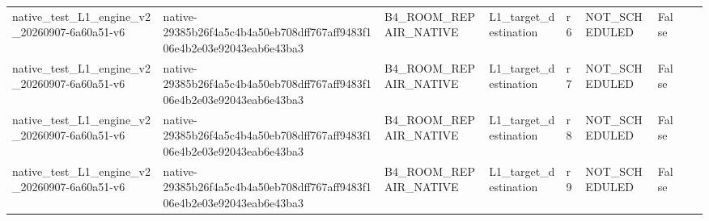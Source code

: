 \begin{tabular}{lllllllll}
native\_test\_L1\_engine\_v2\_20260907-6a60a51-v6 & native-29385b26f4a5c4b4a50eb708dff767aff9483f106e4b2e03e92043eab6e43ba3 & B4\_ROOM\_REPAIR\_NATIVE & L1\_target\_destination & r6 & NOT\_SCHEDULED & False &  &  \\
native\_test\_L1\_engine\_v2\_20260907-6a60a51-v6 & native-29385b26f4a5c4b4a50eb708dff767aff9483f106e4b2e03e92043eab6e43ba3 & B4\_ROOM\_REPAIR\_NATIVE & L1\_target\_destination & r7 & NOT\_SCHEDULED & False &  &  \\
native\_test\_L1\_engine\_v2\_20260907-6a60a51-v6 & native-29385b26f4a5c4b4a50eb708dff767aff9483f106e4b2e03e92043eab6e43ba3 & B4\_ROOM\_REPAIR\_NATIVE & L1\_target\_destination & r8 & NOT\_SCHEDULED & False &  &  \\
native\_test\_L1\_engine\_v2\_20260907-6a60a51-v6 & native-29385b26f4a5c4b4a50eb708dff767aff9483f106e4b2e03e92043eab6e43ba3 & B4\_ROOM\_REPAIR\_NATIVE & L1\_target\_destination & r9 & NOT\_SCHEDULED & False &  &  \\
\end{tabular}
